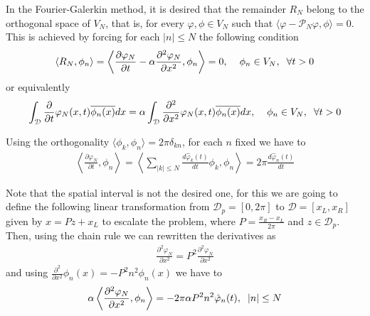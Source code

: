 	In the Fourier-Galerkin method, it is desired that the remainder $R_N$ belong to the orthogonal space of $ V_N $, that is, for every $\varphi, \phi \in V_N $ such that $\langle \varphi - \mathcal{P}_N \varphi, \phi \rangle = 0$. This is achieved by forcing for each $|n| \leq N$ the following condition
	\begin{align}
		\left\langle R_N, \phi_n \right\rangle = \left\langle \frac{\partial \varphi_N}{\partial t} - \alpha \frac{\partial^2 \varphi_N}{\partial x^2}, \phi_n \right\rangle = 0, \hspace{2mm}  \hspace{2mm} \phi_n \in V_N, \hspace{2mm} \forall t > 0
	\end{align}
	or equivalently
	\begin{align*}
		\displaystyle \int_{\mathcal{D}} \frac{\partial}{\partial t} \varphi_N (x, t) \overline{\phi_n (x)} dx = \alpha \int_{\mathcal{D}} \frac{\partial^2}{\partial x^2} \varphi_N (x, t) \overline{\phi_n (x)} dx , \hspace{2mm}  \hspace{2mm} \phi_n \in V_N, \hspace{2mm} \forall t > 0
	\end{align*}
	
	\noindent Using the orthogonality $\langle \phi_k, \phi_n \rangle = 2 \pi \delta_{kn}$, for each $n$ fixed we have to
	\begin{align*}
		\left\langle \frac{\partial \varphi_N}{\partial t}, \phi_n  \right\rangle = \left\langle \displaystyle \sum_{ |k| \leq N} \frac{d \hat{\varphi}_k (t)}{dt} \phi_k, \phi_n  \right\rangle = 2 \pi \frac{d \hat{\varphi}_n (t)}{dt}
	\end{align*}
	
	Note that the spatial interval is not the desired one, for this we are going to define the following linear transformation from $\mathcal{D}_p = [0, 2 \pi]$ to $\mathcal{D} = [x_L, x_R]$ given by $x = P z + x_L$ to escalate the problem, where $P = \frac{x_R - x_L}{2 \pi}$ and $z \in \mathcal{D}_p$. Then, using the chain rule we can rewritten the derivatives as
	\begin{align*}
		\frac{\partial^2 \varphi_N}{\partial x^2} = P^2 \frac{\partial^2 \varphi_N}{\partial x^2} 
	\end{align*}
	and using $\frac{\partial^2}{\partial x^2} \phi_n (x) = -P^2 n^2 \phi_n (x)$ we have to  
	\begin{align*}
		\alpha \left\langle \frac{\partial^2 \varphi_N}{\partial x^2}, \phi_n \right\rangle = -2 \pi \alpha P^2 n^2 \hat{\varphi}_n (t), \hspace{2mm} |n| \leq N
	\end{align*}
	
